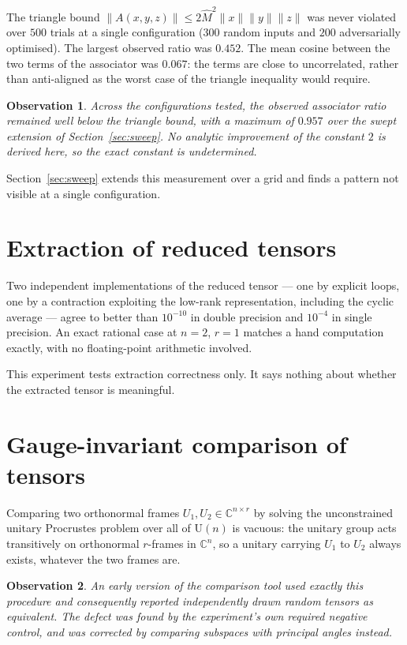 \documentclass[11pt]{amsart}
\newcommand{\norm}[1]{\lVert#1\rVert}
\newtheorem{observation}{Observation}[section]
\theoremstyle{remark}
\begin{document}
The triangle bound $\norm{A(x,y,z)}\le2\widehat M^{2}\norm{x}\norm{y}\norm{z}$ was never
violated over $500$ trials at a single configuration ($300$ random inputs and $200$
adversarially optimised). The largest observed ratio was $0.452$. The mean cosine between
the two terms of the associator was $0.067$: the terms are close to uncorrelated, rather
than anti-aligned as the worst case of the triangle inequality would require.

\begin{observation}
\label{obs:associator}
Across the configurations tested, the observed associator ratio remained well below the
triangle bound, with a maximum of $0.957$ over the swept extension of
Section~\ref{sec:sweep}. No analytic improvement of the constant $2$ is derived here, so
the exact constant is undetermined.
\end{observation}

Section~\ref{sec:sweep} extends this measurement over a grid and finds a pattern not
visible at a single configuration.

\section{Extraction of reduced tensors}
\label{sec:reduced}

Two independent implementations of the reduced tensor --- one by explicit loops, one by a
contraction exploiting the low-rank representation, including the cyclic average --- agree
to better than $10^{-10}$ in double precision and $10^{-4}$ in single precision. An exact
rational case at $n=2$, $r=1$ matches a hand computation exactly, with no floating-point
arithmetic involved.

This experiment tests extraction correctness only. It says nothing about whether the
extracted tensor is meaningful.

\section{Gauge-invariant comparison of tensors}
\label{sec:gauge}

Comparing two orthonormal frames $U_1,U_2\in\mathbb C^{n\times r}$ by solving the
unconstrained unitary Procrustes problem \cite{Schonemann1966} over all of $\mathrm U(n)$ is
vacuous: the unitary group acts transitively on orthonormal $r$-frames in $\mathbb C^{n}$,
so a unitary carrying $U_1$ to $U_2$ always exists, whatever the two frames are.

\begin{observation}
\label{obs:procrustes}
An early version of the comparison tool used exactly this procedure and consequently
reported independently drawn random tensors as equivalent. The defect was found by the
experiment's own required negative control, and was corrected by comparing subspaces with
principal angles \cite{BjorckGolub1973} instead.
\end{observation}
\end{document}
